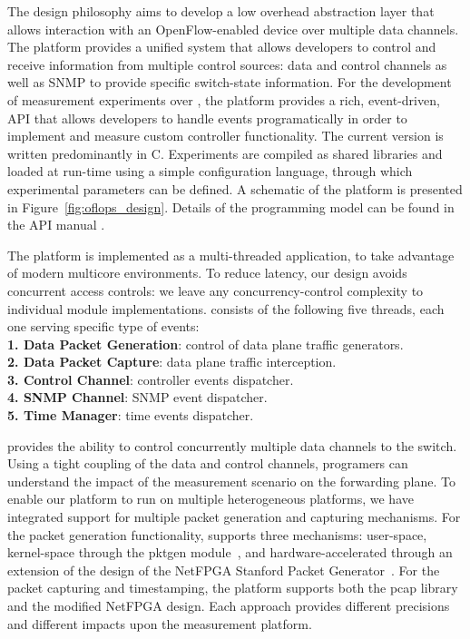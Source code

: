 The \oflops design philosophy aims to develop a low overhead abstraction layer
that allows interaction with an OpenFlow-enabled device over multiple data
channels.  The platform provides a unified system that allows developers to
control and receive information from multiple control sources: data and control
channels as well as SNMP to provide specific switch-state information.
For the development of measurement experiments over \oflops, the platform
provides a rich, event-driven, API that allows developers to handle events
programatically in order to implement and measure custom controller
functionality. The current version is written predominantly in C. Experiments
are compiled as shared libraries and loaded at run-time using a simple
configuration language, through which experimental parameters can be defined.
A schematic of the platform is presented in Figure~\ref{fig:oflops_design}.
Details of the \oflops programming model can be found in the API manual
\cite{oflops-manual}.

The platform is implemented as a multi-threaded application, to take
advantage of modern multicore environments. To reduce latency, our design
avoids concurrent access controls: we leave any concurrency-control complexity 
to individual module implementations. \oflops consists of the following five threads, 
each one serving specific type of events:\\
\textbf{1. Data Packet Generation}: control of data plane traffic generators.\\
\textbf{2. Data Packet Capture}: data plane traffic interception.\\
\textbf{3. Control Channel}: controller events dispatcher.\\
\textbf{4. SNMP Channel}: SNMP event dispatcher.\\
\textbf{5. Time Manager}: time events dispatcher.

\oflops provides the ability to control concurrently multiple data
channels to the switch. Using a tight coupling of the data and control 
channels, programers can understand the impact of the measurement
scenario on the forwarding plane. To enable our platform to run on
multiple heterogeneous platforms, we have integrated support for
multiple packet generation and capturing mechanisms. For the packet
generation functionality, \oflops supports three mechanisms:
user-space, kernel-space through the pktgen module~\cite{pktgen}, and
hardware-accelerated through an extension of the design of the NetFPGA
Stanford Packet Generator~\cite{Covington09}.  For the packet
capturing and timestamping, the platform supports both the pcap
library and the modified NetFPGA design. Each approach provides
different precisions and different impacts upon the measurement
platform.

